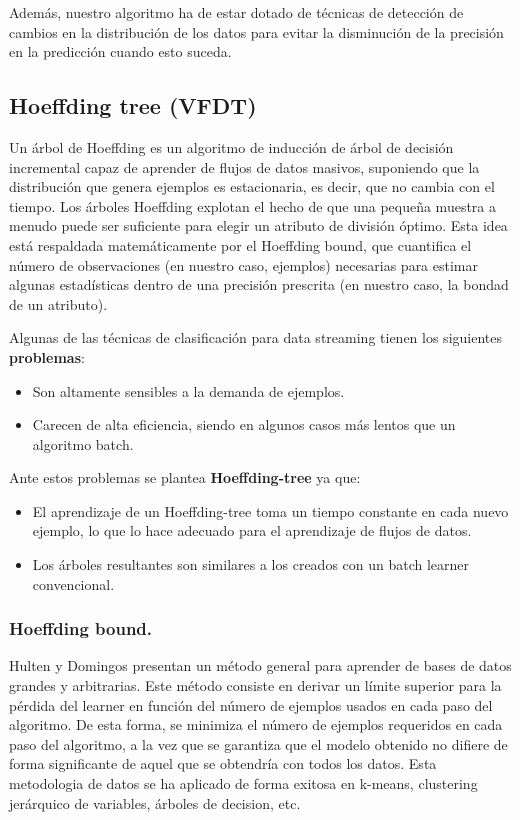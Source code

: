 Además, nuestro algoritmo ha de estar dotado de técnicas de detección de cambios en la distribución de los datos para evitar la disminución de la precisión en la predicción cuando esto suceda.

\subsection{Hoeffding tree (VFDT)}

Un árbol de Hoeffding es un algoritmo de inducción de árbol de decisión incremental capaz de aprender de flujos de datos masivos, suponiendo que la distribución que genera ejemplos es estacionaria, es decir, que no cambia con el tiempo. Los árboles Hoeffding explotan el hecho de que una pequeña muestra a menudo puede ser suficiente para elegir un atributo de división óptimo. Esta idea está respaldada matemáticamente por el Hoeffding bound, que cuantifica el número de observaciones (en nuestro caso, ejemplos) necesarias para estimar algunas estadísticas dentro de una precisión prescrita (en nuestro caso, la bondad de un atributo). \cite{ref9}

Algunas de las técnicas de clasificación para data streaming tienen los siguientes \textbf{problemas}:
\begin{itemize}
	\item Son altamente sensibles a la demanda de ejemplos.
	\item Carecen de alta eficiencia, siendo en algunos casos más lentos que un algoritmo batch.
\end{itemize}

Ante estos problemas se plantea\textbf{ Hoeffding-tree} ya que:
\begin{itemize}
	\item El aprendizaje de un Hoeffding-tree toma un tiempo constante en cada nuevo ejemplo, lo que lo hace adecuado para el aprendizaje de flujos de datos.
	\item Los árboles resultantes son similares a los creados con un batch learner convencional.
\end{itemize}

\subsubsection{Hoeffding bound.}

Hulten y Domingos presentan un método general para aprender de bases de datos grandes y arbitrarias.
Este método consiste en derivar un límite superior para la pérdida del learner en función del número de ejemplos usados en cada paso del algoritmo. De esta forma, se minimiza el número de ejemplos requeridos en cada paso del algoritmo, a la vez que se garantiza que el modelo obtenido no difiere de forma significante de aquel que se obtendría con todos los datos. Esta metodologia de datos se ha aplicado de forma exitosa en k-means, clustering jerárquico de variables, árboles de decision, etc.

